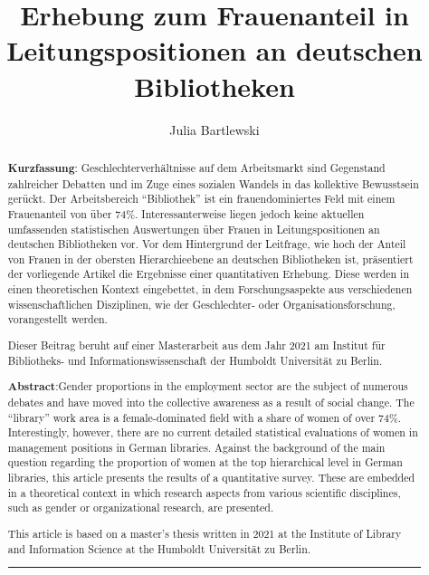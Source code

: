 \documentclass[a4paper,
fontsize=11pt,
oneside,
numbers=noperiodatend,
parskip=half-,
bibliography=totoc,
final
]{scrartcl}
\title{\LARGE{Erhebung zum Frauenanteil in Leitungspositionen an deutschen Bibliotheken}}%
\author{Julia Bartlewski} %
\date{}
\begin{document}
\maketitle
\thispagestyle{fancyplain} 

\begin{abstract}
\noindent
\textbf{Kurzfassung}: Geschlechterverhältnisse auf dem Arbeitsmarkt sind Gegenstand zahlreicher Debatten und im Zuge eines sozialen Wandels in das kollektive Bewusstsein gerückt. Der Arbeitsbereich \enquote{Bibliothek} ist ein frauendominiertes Feld mit einem Frauenanteil von über 74\%. Interessanterweise liegen jedoch keine aktuellen umfassenden statistischen Auswertungen über Frauen in Leitungspositionen an deutschen Bibliotheken vor. Vor dem Hintergrund der Leitfrage, wie hoch der Anteil von Frauen in der obersten Hierarchieebene an deutschen Bibliotheken ist, präsentiert der vorliegende Artikel die Ergebnisse einer quantitativen Erhebung. Diese werden in einen theoretischen Kontext eingebettet, in dem Forschungsaspekte aus verschiedenen wissenschaftlichen Disziplinen, wie der Geschlechter- oder Organisationsforschung, vorangestellt werden.

Dieser Beitrag beruht auf einer Masterarbeit aus dem Jahr 2021 am Institut für Bibliotheks- und Informationswissenschaft der Humboldt Universität zu Berlin.

\textbf{Abstract}:Gender proportions in the employment sector are the subject of numerous debates and have moved into the collective awareness as a result of social change. The \enquote{library} work area is a female-dominated field with a share of women of over 74\%. Interestingly, however, there are no current detailed statistical evaluations of women in management positions in German libraries. Against the background of the main question regarding the proportion of women at the top hierarchical level in German libraries, this article presents the results of a quantitative survey. These are embedded in a theoretical context in which research aspects from various scientific disciplines, such as gender or organizational research, are presented.

This article is based on a master's thesis written in 2021 at the Institute of Library and Information Science at the Humboldt Universität zu Berlin.

\begin{center}\rule{0.5\linewidth}{0.5pt}\end{center}
\end{abstract}
\end{document}
